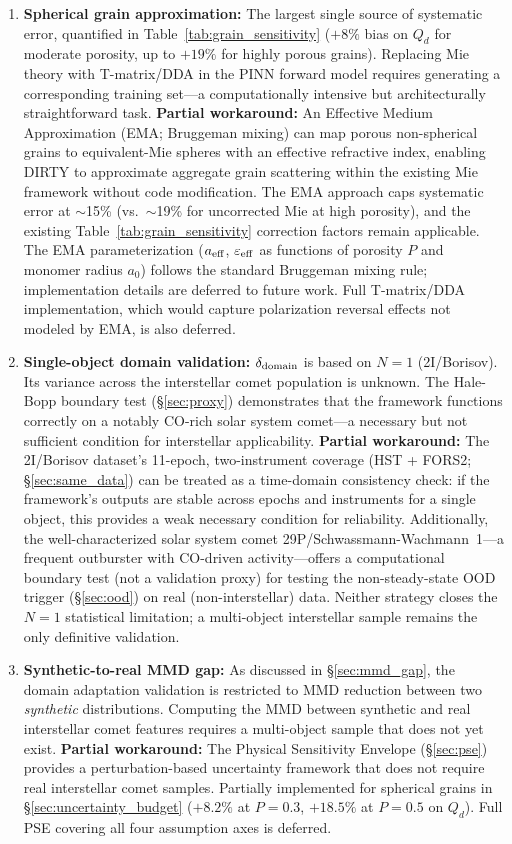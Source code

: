 \documentclass[usenatbib]{mnras}
\begin{document}
\begin{enumerate}
    \item \textbf{Spherical grain approximation:} The largest single source of systematic error, quantified in Table~\ref{tab:grain_sensitivity} ($+8\%$ bias on $Q_d$ for moderate porosity, up to $+19\%$ for highly porous grains). Replacing Mie theory with T-matrix/DDA in the PINN forward model requires generating a corresponding training set---a computationally intensive but architecturally straightforward task. \textbf{Partial workaround:} An Effective Medium Approximation (EMA; Bruggeman mixing) can map porous non-spherical grains to equivalent-Mie spheres with an effective refractive index, enabling DIRTY to approximate aggregate grain scattering within the existing Mie framework without code modification. The EMA approach caps systematic error at $\sim$15\% (vs.\ $\sim$19\% for uncorrected Mie at high porosity), and the existing Table~\ref{tab:grain_sensitivity} correction factors remain applicable. The EMA parameterization ($a_{\rm eff}$, $\varepsilon_{\rm eff}$ as functions of porosity $P$ and monomer radius $a_0$) follows the standard Bruggeman mixing rule; implementation details are deferred to future work. Full T-matrix/DDA implementation, which would capture polarization reversal effects not modeled by EMA, is also deferred.
    \item \textbf{Single-object domain validation:} $\delta_{\rm domain}$ is based on $N=1$ (2I/Borisov). Its variance across the interstellar comet population is unknown. The Hale-Bopp boundary test (\S\ref{sec:proxy}) demonstrates that the framework functions correctly on a notably CO-rich solar system comet---a necessary but not sufficient condition for interstellar applicability. \textbf{Partial workaround:} The 2I/Borisov dataset's 11-epoch, two-instrument coverage (HST + FORS2; \S\ref{sec:same_data}) can be treated as a time-domain consistency check: if the framework's outputs are stable across epochs and instruments for a single object, this provides a weak necessary condition for reliability. Additionally, the well-characterized solar system comet 29P/Schwassmann-Wachmann~1---a frequent outburster with CO-driven activity---offers a computational boundary test (not a validation proxy) for testing the non-steady-state OOD trigger (\S\ref{sec:ood}) on real (non-interstellar) data. Neither strategy closes the $N=1$ statistical limitation; a multi-object interstellar sample remains the only definitive validation.
    \item \textbf{Synthetic-to-real MMD gap:} As discussed in \S\ref{sec:mmd_gap}, the domain adaptation validation is restricted to MMD reduction between two \textit{synthetic} distributions. Computing the MMD between synthetic and real interstellar comet features requires a multi-object sample that does not yet exist. \textbf{Partial workaround:} The Physical Sensitivity Envelope (\S\ref{sec:pse}) provides a perturbation-based uncertainty framework that does not require real interstellar comet samples. Partially implemented for spherical grains in \S\ref{sec:uncertainty_budget} ($+8.2\%$ at $P{=}0.3$, $+18.5\%$ at $P{=}0.5$ on $Q_d$). Full PSE covering all four assumption axes is deferred.

\end{enumerate}
\end{document}
